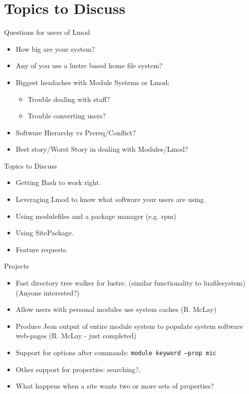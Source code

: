 \documentclass{beamer}
\begin{document}
\section{Topics to Discuss}

\begin{frame}{Questions for users of Lmod}
  \begin{itemize}
    \item How big are your system?
    \item Any of you use a lustre based home file system?
    \item Biggest headaches with Module Systems or Lmod:
      \begin{itemize}
        \item Trouble dealing with staff?
        \item Trouble converting users?
      \end{itemize}
    \item Software Hierarchy vs Prereq/Conflict?
    \item Best story/Worst Story in dealing with Modules/Lmod?
  \end{itemize}
\end{frame}

\begin{frame}{Topics to Discuss}
  \begin{itemize}
    \item Getting Bash to work right.
    \item Leveraging Lmod to know what software your users are using.
    \item Using modulefiles and a package manager (e.g. rpm)
    \item Using SitePackage.
    \item Feature requests.
  \end{itemize}
\end{frame}

\begin{frame}{Projects}
  \begin{itemize}
    \item Fast directory tree walker for lustre. (similar
      functionality to luafilesystem) (Anyone interested?)
    \item Allow users with personal modules use system caches (R. McLay)
    \item Produce Json output of entire module system to populate
      system software web-pages (R. McLay - just completed)
    \item Support for options after commands:  \texttt{module keyword --prop mic}
    \item Other support for properties: searching?,
    \item What happens when a site wants two or more sets of properties?
  \end{itemize}
\end{frame}
\end{document}
